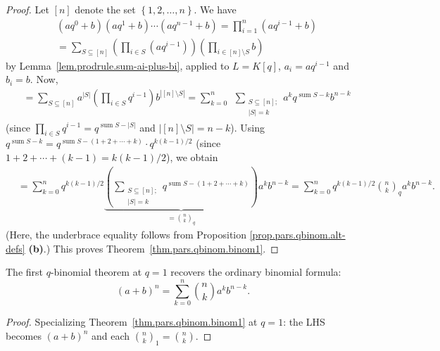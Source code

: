 \begin{proof}
\leanok
Let $\left[  n\right]  $ denote the set $\left\{  1,2,\ldots,n\right\}  $. We have
\begin{align*}
&  \left(  aq^{0}+b\right)  \left(  aq^{1}+b\right)  \cdots\left(
aq^{n-1}+b\right)  =\prod_{i=1}^{n}\left(  aq^{i-1}+b\right) \\
&  =\sum_{S\subseteq\left[  n\right]  }\left(  \prod_{i\in
S}\left(  aq^{i-1}\right)  \right) \left(  \prod_{i\in\left[  n\right]
\setminus S}b\right)
\end{align*}
by Lemma~\ref{lem.prodrule.sum-ai-plus-bi}, applied to $L=K\left[  q\right]$,
$a_{i}=aq^{i-1}$ and $b_{i}=b$.
Now,
\begin{align*}
&  =\sum_{S\subseteq\left[  n\right]  }
a^{\left\vert S\right\vert }
\left(  \prod_{i\in S}q^{i-1}\right)
b^{\left\vert \left[  n\right]  \setminus S\right\vert }
=\sum_{k=0}^{n}\ \ \sum_{\substack{S\subseteq\left[  n\right]
;\\\left\vert S\right\vert =k}}
a^{k}
q^{\operatorname{sum}S-k}
b^{n-k}
\end{align*}
(since $\prod_{i\in S}q^{i-1} = q^{\operatorname{sum}S - |S|}$
and $|[n]\setminus S| = n - k$).
Using
$q^{\operatorname{sum}S-k}
= q^{\operatorname{sum}S-(1+2+\cdots+k)} \cdot q^{k(k-1)/2}$
(since $1+2+\cdots+(k-1) = k(k-1)/2$),
we obtain
\begin{align*}
&  =\sum_{k=0}^{n}q^{k\left(  k-1\right)  /2}\underbrace{\left(
\sum\limits_{\substack{S\subseteq\left[  n\right]  ;\\\left\vert S\right\vert
=k}}q^{\operatorname{sum}S-\left(  1+2+\cdots+k\right)  }\right)
}_{=\binom{n}{k}_{q}}a^{k}b^{n-k}
=\sum_{k=0}^{n}q^{k\left(  k-1\right)  /2}\binom{n}{k}_{q}a^{k}b^{n-k}.
\end{align*}
(Here, the underbrace equality follows from Proposition
\ref{prop.pars.qbinom.alt-defs} \textbf{(b)}.)
This proves Theorem~\ref{thm.pars.qbinom.binom1}.
\end{proof}

\begin{lemma}
\label{lem.qbinomial-formulas.binom1-at-one}
\leanhelper
\leanok
The first $q$-binomial theorem at $q = 1$ recovers the ordinary binomial formula:
\[
(a+b)^n = \sum_{k=0}^{n} \binom{n}{k} a^k b^{n-k}.
\]
\end{lemma}

\begin{proof}
\leanok
Specializing Theorem~\ref{thm.pars.qbinom.binom1} at $q = 1$: the LHS becomes
$(a+b)^n$ and each $\binom{n}{k}_1 = \binom{n}{k}$.
\end{proof}

